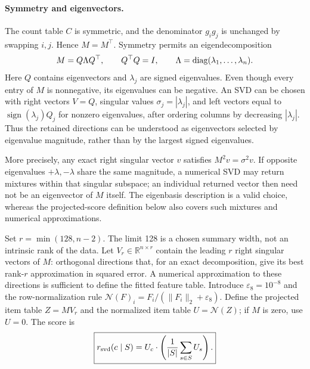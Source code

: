 \documentclass[11pt,a4paper]{article}
\newcommand{\N}{\mathcal N}\newcommand{\sd}{\operatorname{sd}}
\numberwithin{equation}{section}
\begin{document}
\paragraph{Symmetry and eigenvectors.}
The count table $C$ is symmetric, and the denominator $g_ig_j$ is unchanged by
swapping $i,j$. Hence $M=M^\top$. Symmetry permits an eigendecomposition
\begin{equation}
 M=Q\Lambda Q^\top,\qquad Q^\top Q=I,\qquad
 \Lambda=\operatorname{diag}(\lambda_1,\ldots,\lambda_n).
\end{equation}
Here $Q$ contains eigenvectors and $\lambda_j$ are signed eigenvalues. Even
though every entry of $M$ is nonnegative, its eigenvalues can be negative.
An SVD can be chosen with right vectors $V=Q$, singular values
$\sigma_j=|\lambda_j|$, and left vectors equal to
$\operatorname{sign}(\lambda_j)Q_j$ for nonzero eigenvalues, after ordering
columns by decreasing $|\lambda_j|$. Thus the retained directions can be
understood as eigenvectors selected by eigenvalue magnitude, rather than by
the largest signed eigenvalues.

More precisely, any exact right singular vector $v$ satisfies
$M^2v=\sigma^2v$. If opposite eigenvalues $+\lambda,-\lambda$ share the same
magnitude, a numerical SVD may return mixtures within that singular subspace;
an individual returned vector then need not be an eigenvector of $M$ itself.
The eigenbasis description is a valid choice, whereas the projected-score
definition below also covers such mixtures and numerical approximations.

Set $r=\min(128,n-2)$. The limit 128 is a chosen summary width, not an intrinsic rank of the data. Let $V_r\in\mathbb R^{n\times r}$ contain the leading $r$ right singular vectors of
$M$: orthogonal directions that, for an exact decomposition, give its best rank-$r$ approximation in squared error. A numerical approximation to these directions is sufficient to define the fitted feature table.
Introduce $\varepsilon_8=10^{-8}$ and the row-normalization rule
$\N(F)_i=F_i/(\lVert F_i\rVert_2+\varepsilon_8)$. Define the projected item table
$Z=MV_r$ and the normalized item table $U=\N(Z)$; if $M$ is
zero, use $U=0$. The score is
\begin{equation}
 \boxed{r_{\rm svd}(c\mid S)=U_c\cdot\left(\frac1{|S|}\sum_{s\in S}U_s\right).}
\end{equation}
\end{document}

